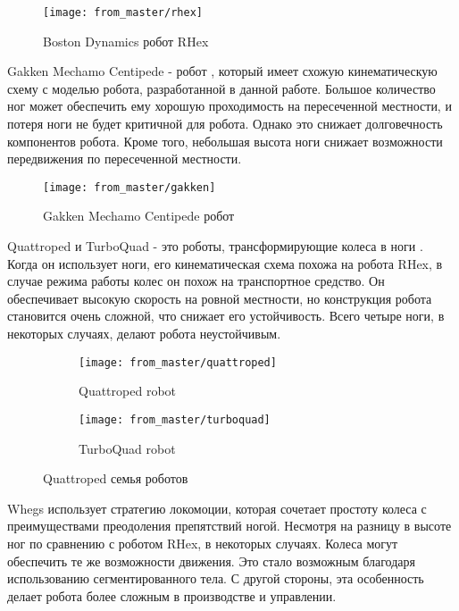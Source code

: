 \begin{figure}[H]
    \centering\texttt{[image: from\_master/rhex]}\\
    \caption{Boston Dynamics робот RHex}
    \label{fig:rhex}
    \end{figure}

Gakken Mechamo Centipede \cite{miller2008extreme} - робот , который имеет схожую кинематическую схему с моделью робота, разработанной в данной работе. Большое количество ног может обеспечить ему хорошую проходимость на пересеченной местности, и потеря ноги не будет критичной для робота. Однако это снижает долговечность компонентов робота. Кроме того, небольшая высота ноги снижает возможности передвижения по пересеченной местности.
\begin{figure}[H]
    \centering\texttt{[image: from\_master/gakken]}\\
    \caption{Gakken Mechamo Centipede робот}
    \label{fig:gakken}
    \end{figure}

Quattroped \cite{chen2014quattroped,chen2017turboquad} и TurboQuad - это роботы, трансформирующие колеса в ноги . Когда он использует ноги, его кинематическая схема похожа на робота RHex, в случае режима работы колес он похож на транспортное средство. Он обеспечивает высокую скорость на ровной местности, но конструкция робота становится очень сложной, что снижает его устойчивость. Всего четыре ноги, в некоторых случаях, делают робота неустойчивым.

\begin{figure}[H]
    \begin{subfigure}{0.49\textwidth}
    \centering\texttt{[image: from\_master/quattroped]}\\
    \caption{Quattroped robot}
    \label{fig:quattroped}
    \end{subfigure}
    \begin{subfigure}{0.49\textwidth}
    \centering\texttt{[image: from\_master/turboquad]}\\
    \caption{TurboQuad robot}
    \label{fig:turboquad}
    \end{subfigure}
    \caption{Quattroped семья роботов}
    \label{quatro}
    \end{figure}

Whegs \cite{schroer2004comparing}  использует стратегию локомоции, которая сочетает простоту колеса с преимуществами преодоления препятствий ногой. Несмотря на разницу в высоте ног по сравнению с роботом RHex, в некоторых случаях. Колеса могут обеспечить те же возможности движения. Это стало возможным благодаря использованию сегментированного тела. С другой стороны, эта особенность делает робота более сложным в производстве и управлении.

